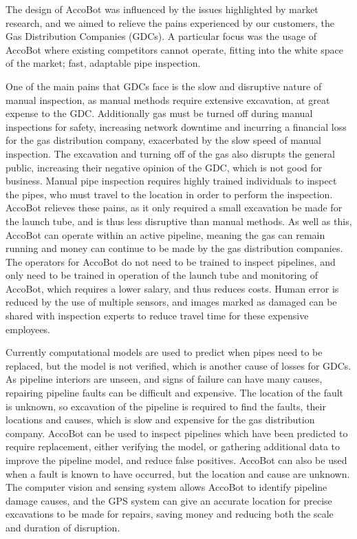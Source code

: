 \documentclass[11pt]{article}		%
\begin{document}
		The design of AccoBot was influenced by the issues highlighted by market research, and we aimed to relieve the pains experienced by our customers, the Gas Distribution Companies (GDCs).
		A particular focus was the usage of AccoBot where existing competitors cannot operate, fitting into the white space of the market; fast, adaptable pipe inspection.
		
		One of the main pains that GDCs face is the slow and disruptive nature of manual inspection, as manual methods require extensive excavation, at great expense to the GDC.
		Additionally gas must be turned off during manual inspections for safety, increasing network downtime and incurring a financial loss for the gas distribution company, exacerbated by the slow speed of manual inspection.
		The excavation and turning off of the gas also disrupts the general public, increasing their negative opinion of the GDC, which is not good for business.
		Manual pipe inspection requires highly trained individuals to inspect the pipes, who must travel to the location in order to perform the inspection.
		AccoBot relieves these pains, as it only required a small excavation be made for the launch tube, and is thus less disruptive than manual methods.
		As well as this, AccoBot can operate within an active pipeline, meaning the gas can remain running and money can continue to be made by the gas distribution companies.
		The operators for AccoBot do not need to be trained to inspect pipelines, and only need to be trained in operation of the launch tube and monitoring of AccoBot, which requires a lower salary, and thus reduces costs.
		Human error is reduced by the use of multiple sensors, and images marked as damaged can be shared with inspection experts to reduce travel time for these expensive employees.
		
		Currently computational models are used to predict when pipes need to be replaced, but the model is not verified, which is another cause of losses for GDCs.
		As pipeline interiors are unseen, and signs of failure can have many causes, repairing pipeline faults can be difficult and expensive.
		The location of the fault is unknown, so excavation of the pipeline is required to find the faults, their locations and causes, which is slow and expensive for the gas distribution company.
		AccoBot can be used to inspect pipelines which have been predicted to require replacement, either verifying the model, or gathering additional data to improve the pipeline model, and reduce false positives.
		AccoBot can also be used when a fault is known to have occurred, but the location and cause are unknown.
		The computer vision and sensing system allows AccoBot to identify pipeline damage causes, and the GPS system can give an accurate location for precise excavations to be made for repairs, saving money and reducing both the scale and duration of disruption.
		
\end{document}
